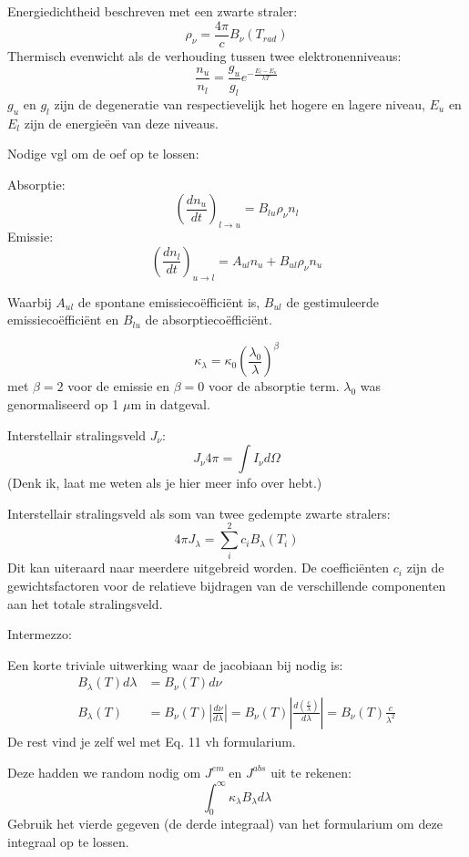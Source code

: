 \documentclass[a4paper,twoside]{article}
\theoremstyle{definition}
\theoremstyle{plain}
\begin{document}
Energiedichtheid beschreven met een zwarte straler:
\[
\rho_\nu = \frac{4 \pi}{c} B_\nu(T_{rad})
\]
Thermisch evenwicht als de verhouding tussen twee elektronenniveaus:
\[
\frac{n_u}{n_l} = \frac{g_u}{g_l} e^{-\frac{E_l - E_u}{k T}}
\]
\(g_u\) en \(g_l\) zijn de degeneratie van respectievelijk het hogere en lagere niveau,
\(E_u\) en \(E_l\) zijn de energieën van deze niveaus.

Nodige vgl om de oef op te lossen:

Absorptie:
\[
\left(\frac{dn_u}{dt}\right)_{l \to u} = B_{lu} \rho_\nu n_l
\]
Emissie:
\[
\left(\frac{dn_l}{dt}\right)_{u \to l} = A_{ul} n_u + B_{ul} \rho_\nu n_u
\]

Waarbij \(A_{ul}\) de spontane emissiecoëfficiënt is, \(B_{ul}\) de gestimuleerde emissiecoëfficiënt en \(B_{lu}\) de absorptiecoëfficiënt.

\[
\kappa_\lambda = \kappa_0 \left(\frac{\lambda_0}{\lambda}\right)^\beta
\]
met \(\beta = 2\) voor de emissie en \(\beta = 0\) voor de absorptie term. \(\lambda_0\) was genormaliseerd op 1 \(\mu \)m in datgeval.


Interstellair stralingsveld \(J_\nu\):
\begin{equation}
    J_\nu 4 \pi = \int I_\nu d\Omega
\end{equation}
(Denk ik, laat me weten als je hier meer info over hebt.)


Interstellair stralingsveld als som van twee gedempte zwarte stralers:
\[
4\pi J_\lambda = \sum_i^2 c_i B_\lambda (T_i)
\]
Dit kan uiteraard naar meerdere uitgebreid worden.
De coefficiënten \(c_i\) zijn de gewichtsfactoren voor de relatieve bijdragen van de verschillende componenten aan het totale stralingsveld.


Intermezzo:

Een korte triviale uitwerking waar de jacobiaan bij nodig is:
\begin{align*}
    B_\lambda(T)d\lambda &= B_\nu(T) d\nu \\
    B_\lambda(T) &= B_\nu(T) \left| \frac{d\nu}{d\lambda} \right|
    = B_\nu(T) \left| \frac{d \left( \frac{c}{\lambda} \right) }{d\lambda} \right|
    = B_\nu(T) \frac{c}{\lambda^2}
\end{align*}
De rest vind je zelf wel met Eq. 11 vh formularium.




Deze hadden we random nodig om \(J^{em}\) en \(J^{abs}\) uit te rekenen:
\[
\int_{0}^{\infty}\kappa_\lambda B_\lambda d \lambda
\]
Gebruik het vierde gegeven (de derde integraal) van het formularium om deze integraal op te lossen.
\end{document}
